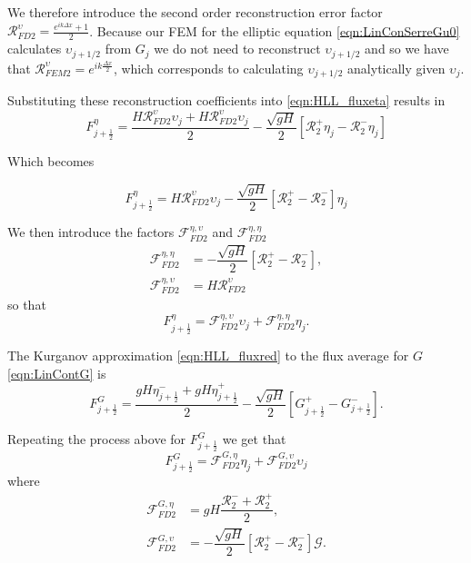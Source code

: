 We therefore introduce the second order reconstruction error factor $\mathcal{R}^\upsilon_{FD2} = \frac{e^{ik\Delta x } + 1}{2}$. Because our FEM for the elliptic equation \ref{eqn:LinConSerreGu0} calculates $\upsilon_{j+1/2}$ from $G_j$ we do not need to reconstruct $\upsilon_{j+1/2}$ and so we have that $\mathcal{R}^\upsilon_{FEM2} = e^{ik\frac{\Delta x}{2} }$, which corresponds to calculating $\upsilon_{j+1/2}$ analytically given $\upsilon_{j}$. 

Substituting these reconstruction coefficients into \eqref{eqn:HLL_fluxeta} results in
\begin{equation*}
F^{\eta}_{j+\frac{1}{2}} = \dfrac{ H  \mathcal{R}^\upsilon_{FD2} \upsilon_{j}+ H\mathcal{R}^\upsilon_{FD2} \upsilon_{j}}{ 2}  - \dfrac{ \sqrt{gH}}{ 2} \left [  \mathcal{R}^+_2 {\eta}_j -  \mathcal{R}^-_2{\eta}_j \right ]
\end{equation*}

Which becomes

\begin{equation*}
F^{\eta}_{j+\frac{1}{2}} = H \mathcal{R}^\upsilon_{FD2} \upsilon_{j}   - \dfrac{ \sqrt{gH}}{ 2} \left [  \mathcal{R}^+_2 -  \mathcal{R}^-_2 \right ] {\eta}_j
\end{equation*}

We then introduce the factors $\mathcal{F}^{\eta,\upsilon}_{FD2}$ and $\mathcal{F}^{\eta,\eta}_{FD2}$
\begin{align}
\label{eqn:FluxFactorsh}
\mathcal{F}^{\eta,\eta}_{FD2} & = - \dfrac{ \sqrt{gH}}{ 2} \left [  \mathcal{R}^+_2 -  \mathcal{R}^-_2 \right ],\\
\mathcal{F}^{\eta,\upsilon}_{FD2} & = H \mathcal{R}^\upsilon_{FD2}
\end{align}
so that
\begin{equation}
\label{eqn:etafluxapprox}
F^{\eta}_{j+\frac{1}{2}} = \mathcal{F}^{\eta,\upsilon}_{FD2} \upsilon_{j}   +  \mathcal{F}^{\eta,\eta}_{FD2} {\eta}_j.
\end{equation}


The Kurganov approximation \eqref{eqn:HLL_fluxred} to the flux average for $G$ \eqref{eqn:LinContG} is
\begin{equation*}
F^{G}_{j+\frac{1}{2}} = \dfrac{ gH \eta ^-_{j+\frac{1}{2}}+ gH \eta ^+_{j+\frac{1}{2}}}{ 2}  - \dfrac{ \sqrt{gH}}{ 2} \left [ G^+_{j+\frac{1}{2}} - G^-_{j+\frac{1}{2}} \right ].
\end{equation*}

Repeating the process above for $F^{G}_{j+\frac{1}{2}}$ we get that
\begin{equation}
\label{eqn:Gfluxapprox}
F^{G}_{j+\frac{1}{2}} =  \mathcal{F}^{G,\eta}_{FD2} \eta_{j}  + \mathcal{F}^{G,\upsilon}_{FD2}\upsilon_j
\end{equation}
where
\begin{align}
\label{eqn:FluxFactorsG}
\mathcal{F}^{G,\eta}_{FD2} & = gH \dfrac{\mathcal{R}^-_2 + \mathcal{R}^+_2 }{ 2}, \\
\mathcal{F}^{G,\upsilon}_{FD2} & = - \dfrac{ \sqrt{gH}}{ 2} \left [  \mathcal{R}^+_2 -  \mathcal{R}^-_2 \right ] \mathcal{G}.
\end{align}

